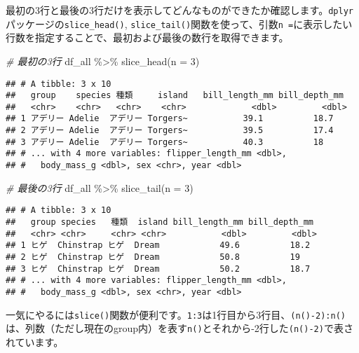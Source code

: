\documentclass[
  xelatex,ja=standard, b5paper]{bxjsbook}
\newenvironment{Shaded}{\begin{snugshade}}{\end{snugshade}}
\newcommand{\AttributeTok}[1]{\textcolor[rgb]{0.77,0.63,0.00}{#1}}
\newcommand{\CommentTok}[1]{\textcolor[rgb]{0.56,0.35,0.01}{\textit{#1}}}
\newcommand{\DecValTok}[1]{\textcolor[rgb]{0.00,0.00,0.81}{#1}}
\newcommand{\FunctionTok}[1]{\textcolor[rgb]{0.00,0.00,0.00}{#1}}
\newcommand{\NormalTok}[1]{#1}
\newcommand{\SpecialCharTok}[1]{\textcolor[rgb]{0.00,0.00,0.00}{#1}}
\begin{document}
最初の3行と最後の3行だけを表示してどんなものができたか確認します。\texttt{dplyr}パッケージの\texttt{slice\_head()}, \texttt{slice\_tail()}関数を使って、引数\texttt{n\ =}に表示したい行数を指定することで、最初および最後の数行を取得できます。

\begin{Shaded}
\begin{Highlighting}[]
\CommentTok{\# 最初の3行}
\NormalTok{df\_all }\SpecialCharTok{\%\textgreater{}\%} \FunctionTok{slice\_head}\NormalTok{(}\AttributeTok{n =} \DecValTok{3}\NormalTok{)}
\end{Highlighting}
\end{Shaded}

\begin{verbatim}
## # A tibble: 3 x 10
##   group    species 種類     island   bill_length_mm bill_depth_mm
##   <chr>    <chr>   <chr>    <chr>             <dbl>         <dbl>
## 1 アデリー Adelie  アデリー Torgers~           39.1          18.7
## 2 アデリー Adelie  アデリー Torgers~           39.5          17.4
## 3 アデリー Adelie  アデリー Torgers~           40.3          18  
## # ... with 4 more variables: flipper_length_mm <dbl>,
## #   body_mass_g <dbl>, sex <chr>, year <dbl>
\end{verbatim}

\begin{Shaded}
\begin{Highlighting}[]
\CommentTok{\# 最後の3行}
\NormalTok{df\_all }\SpecialCharTok{\%\textgreater{}\%} \FunctionTok{slice\_tail}\NormalTok{(}\AttributeTok{n =} \DecValTok{3}\NormalTok{)}
\end{Highlighting}
\end{Shaded}

\begin{verbatim}
## # A tibble: 3 x 10
##   group species   種類  island bill_length_mm bill_depth_mm
##   <chr> <chr>     <chr> <chr>           <dbl>         <dbl>
## 1 ヒゲ  Chinstrap ヒゲ  Dream            49.6          18.2
## 2 ヒゲ  Chinstrap ヒゲ  Dream            50.8          19  
## 3 ヒゲ  Chinstrap ヒゲ  Dream            50.2          18.7
## # ... with 4 more variables: flipper_length_mm <dbl>,
## #   body_mass_g <dbl>, sex <chr>, year <dbl>
\end{verbatim}

一気にやるには\texttt{slice()}関数が便利です。\texttt{1:3}は1行目から3行目、\texttt{(n()-2):n()}は、列数（ただし現在のgroup内）を表す\texttt{n()}とそれから-2行した\texttt{(n()-2)}で表されています。
\end{document}

